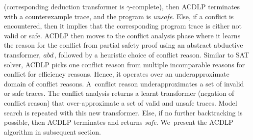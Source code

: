 (corresponding deduction transformer is $\gamma$-complete), then ACDLP 
terminates with a counterexample trace, and the program is \emph{unsafe}.  
Else, if a conflict is encountered, then it implies that the corresponding 
program trace is either not valid or safe.  ACDLP then moves to the conflict 
analysis phase where it learns the reason for the conflict from 
partial safety proof using an
abstract abductive transformer, $abd_{}^{}$, followed by a heuristic choice of conflict 
reason.  Similar to SAT solver, ACDLP picks one conflict reason from multiple
incomparable reasons for conflict for efficiency reasons. Hence, it operates over 
an underapproximate domain of conflict reasons.  A~conflict reason
underapproximates a set of invalid or safe traces. The conflict analysis returns a 
learnt transformer (negation of conflict reason) that over-approximate a set of 
valid and unsafe traces. Model search is repeated with this new transformer.  
Else, if no further backtracking is possible, then ACDLP terminates and returns
\emph{safe}.  We~present the ACDLP algorithm in subsequent section.

